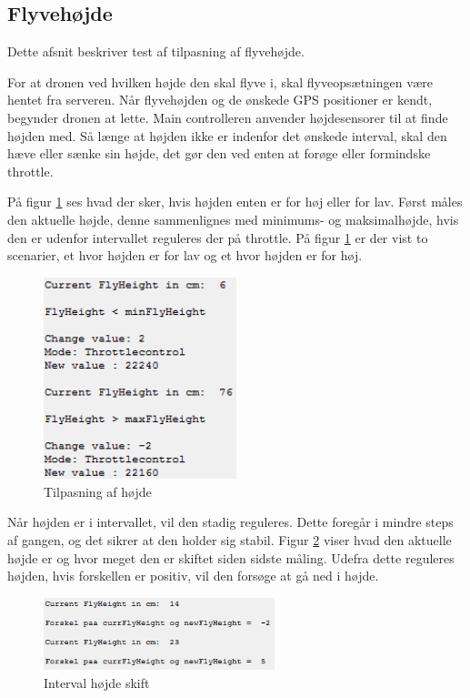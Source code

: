 \subsection{Flyvehøjde}

Dette afsnit beskriver test af tilpasning af flyvehøjde.

For at dronen ved hvilken højde den skal flyve i, skal flyveopsætningen være hentet fra serveren. Når flyvehøjden og de ønskede GPS positioner er kendt, begynder dronen at lette. Main controlleren anvender højdesensorer til at finde højden med. Så længe at højden ikke er indenfor det ønskede interval, skal den hæve eller sænke sin højde, det gør den ved enten at forøge eller formindske throttle. 

På figur \ref{fig:skift_hoejde} ses hvad der sker, hvis højden enten er for høj eller for lav. Først måles den aktuelle højde, denne sammenlignes med minimums- og maksimalhøjde, hvis den er udenfor intervallet reguleres der på throttle. 
På figur \ref{fig:skift_hoejde} er der vist to scenarier, et hvor højden er for lav og et hvor højden er for høj.

\begin{figure}[H]
\centering
\includegraphics[width=0.5\textwidth]{Billeder/Test/skift_hoejde.png}
\caption{Tilpasning af højde}
\label{fig:skift_hoejde}
\end{figure}

Når højden er i intervallet, vil den stadig reguleres. Dette foregår i mindre steps af gangen, og det sikrer at den holder sig stabil.
Figur \ref{fig:interval_skift} viser hvad den aktuelle højde er og hvor meget den er skiftet siden sidste måling. Udefra dette reguleres højden, hvis forskellen er positiv, vil den forsøge at gå ned i højde.

\begin{figure}[H]
\centering
\includegraphics[width=0.6\textwidth]{Billeder/Test/hoejdei_interval_skift.png}
\caption{Interval højde skift}
\label{fig:interval_skift}
\end{figure}